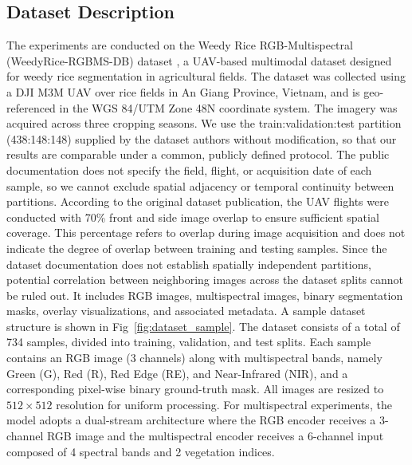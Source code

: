 \documentclass[pdflatex,sn-mathphys-num]{sn-jnl}
\newcommand{\rev}[1]{{\color{revisionblue}#1}}
\begin{document}
\subsection{Dataset Description}
The experiments are conducted on the Weedy Rice RGB-Multispectral (WeedyRice-RGBMS-DB) dataset \cite{nguyen2025dataset}, a UAV-based multimodal dataset designed for weedy rice segmentation in agricultural fields. The dataset was collected using a DJI M3M UAV over rice fields in An Giang Province, Vietnam, and is geo-referenced in the WGS 84/UTM Zone 48N coordinate system. \rev{The imagery was acquired across three cropping seasons. We use the train:validation:test partition (438:148:148) supplied by the dataset authors without modification, so that our results are comparable under a common, publicly defined protocol. The public documentation does not specify the field, flight, or acquisition date of each sample, so we cannot exclude spatial adjacency or temporal continuity between partitions. According to the original dataset publication, the UAV flights were conducted with 70\% front and side image overlap to ensure sufficient spatial coverage. This percentage refers to overlap during image acquisition and does not indicate the degree of overlap between training and testing samples. Since the dataset documentation does not establish spatially independent partitions, potential correlation between neighboring images across the dataset splits cannot be ruled out.} It includes RGB images, multispectral images, binary segmentation masks, overlay visualizations, and associated metadata. A sample dataset structure is shown in Fig~\ref{fig:dataset_sample}. The dataset consists of a total of 734 samples, divided into training, validation, and test splits. Each sample contains an RGB image (3 channels) along with multispectral bands, namely Green (G), Red (R), Red Edge (RE), and Near-Infrared (NIR), and a corresponding pixel-wise binary ground-truth mask. All images are resized to $512 \times 512$ resolution for uniform processing. For multispectral experiments, the model adopts a dual-stream architecture where the RGB encoder receives a 3-channel RGB image and the multispectral encoder receives a 6-channel input composed of 4 spectral bands and 2 vegetation indices.
\end{document}
